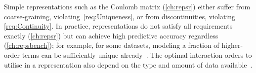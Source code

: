 Simple representations such as the Coulomb matrix (\cref{ch:repsr}) either suffer from coarse-graining, violating~\ref{req:Uniqueness}, or from discontinuities, violating \ref{req:Continuity}.
%
In practice, representations do not satisfy all requirements exactly (\cref{ch:repsr}) but can achieve high predictive accuracy regardless (\cref{ch:repsbench});
for example, for some datasets, modeling a fraction of higher-order terms can be sufficiently unique already~\cite{jkak2020q}.
The optimal interaction orders to utilise in a representation also depend on the type and amount of data available~\cite{gzfd2020q}.

